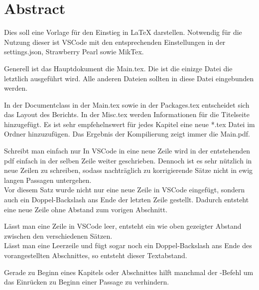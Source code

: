 \chapter*{Abstract}
Dies soll eine Vorlage für den Einstieg in LaTeX darstellen.
Notwendig für die Nutzung dieser ist VSCode mit den entsprechenden Einstellungen in der settings.json, Strawberry Pearl sowie MikTex.

Generell ist das Hauptdokument die Main.tex. Die ist die einizge Datei die letztlich ausgeführt wird. Alle anderen Dateien sollten in diese Datei eingebunden werden.

In der Documentclass in der Main.tex sowie in der Packages.tex entscheidet sich das Layout des Berichts. In der Misc.tex werden Informationen für die Titelseite hinzugefügt.
Es ist sehr empfehelnswert für jedes Kapitel eine neue *.tex Datei im Ordner  hinzuzufügen. Das Ergebnis der Kompilierung zeigt immer die Main.pdf.

Schreibt man einfach nur In VSCode in eine neue Zeile wird in der entstehenden pdf einfach in der selben Zeile weiter geschrieben.
Dennoch ist es sehr nützlich in neue Zeilen zu schreiben, sodass nachträglich zu korrigierende Sätze nicht in ewig langen Passagen untergehen. \\
Vor diesem Satz wurde nicht nur eine neue Zeile in VSCode eingefügt, sondern auch ein Doppel-Backslash \gans{\textbackslash\textbackslash} ans Ende der letzten Zeile gestellt. Dadurch entsteht eine neue Zeile ohne Abstand zum vorigen Abschnitt.

Lässt man eine Zeile in VSCode leer, entsteht ein wie oben gezeigter Abstand zwischen den verschiedenen Sätzen.\\

Lässt man eine Leerzeile und fügt sogar noch ein Doppel-Backslash \gans{\textbackslash\textbackslash} ans Ende des vorangestellten Abschnittes, so entsteht dieser Textabstand.

Gerade zu Beginn eines Kapitels oder Abschnittes hilft manchmal der -Befehl um das Einrücken zu Beginn einer Passage zu verhindern.

\cleardoublepage
